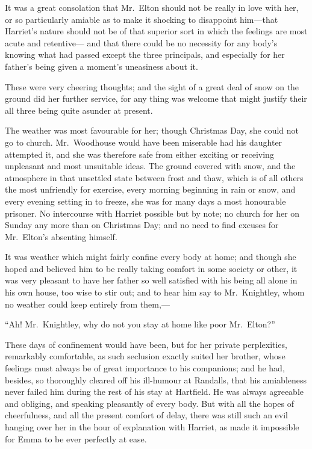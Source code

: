 It was a great consolation that Mr.\ Elton should not be really
in love with her, or so particularly amiable as to make it shocking
to disappoint him---that Harriet's nature should not be of that
superior sort in which the feelings are most acute and retentive---%
and that there could be no necessity for any body's knowing
what had passed except the three principals, and especially
for her father's being given a moment's uneasiness about it.

These were very cheering thoughts; and the sight of a great deal
of snow on the ground did her further service, for any thing was
welcome that might justify their all three being quite asunder
at present.

The weather was most favourable for her; though Christmas Day,
she could not go to church.  Mr.\ Woodhouse would have been miserable
had his daughter attempted it, and she was therefore safe from
either exciting or receiving unpleasant and most unsuitable ideas.
The ground covered with snow, and the atmosphere in that unsettled
state between frost and thaw, which is of all others the most
unfriendly for exercise, every morning beginning in rain or snow,
and every evening setting in to freeze, she was for many days a most
honourable prisoner.  No intercourse with Harriet possible but by note;
no church for her on Sunday any more than on Christmas Day; and no
need to find excuses for Mr.\ Elton's absenting himself.

It was weather which might fairly confine every body at home;
and though she hoped and believed him to be really taking comfort
in some society or other, it was very pleasant to have her father
so well satisfied with his being all alone in his own house,
too wise to stir out; and to hear him say to Mr.\ Knightley, whom no
weather could keep entirely from them,---%

``Ah!  Mr.\ Knightley, why do not you stay at home like poor Mr.\ Elton?''

These days of confinement would have been, but for her private
perplexities, remarkably comfortable, as such seclusion exactly
suited her brother, whose feelings must always be of great importance
to his companions; and he had, besides, so thoroughly cleared off
his ill-humour at Randalls, that his amiableness never failed him
during the rest of his stay at Hartfield.  He was always agreeable
and obliging, and speaking pleasantly of every body.  But with all
the hopes of cheerfulness, and all the present comfort of delay,
there was still such an evil hanging over her in the hour of explanation
with Harriet, as made it impossible for Emma to be ever perfectly at ease.



